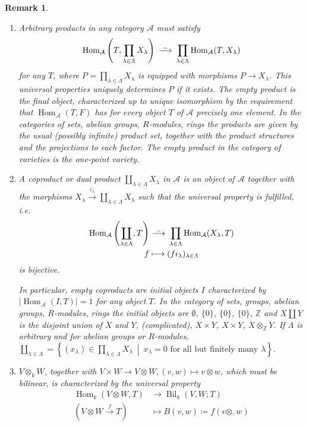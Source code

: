 \documentclass[DIV=14,parskip=full,pointednumbers]{scrartcl}
\newenvironment{alphanumerate}{\begin{enumerate}[label={\upshape(\alph*)},ref=\curthm]}{\end{enumerate}}
\theoremstyle{cthm}
\theoremstyle{cvarthm}
\theoremstyle{cdef}
\newtheorem*{rem*}{Remark}
\newcommand{\Aa}{\mathcal{A}}
\newcommand{\IZ}{\mathbb{Z}}
\newcommand{\Hom}{\operatorname{Hom}}
\newcommand{\longto}{\longrightarrow}
\newcommand{\isomorphism}{
	\tikz[baseline=(a.base)] \node (a) at (0,0) {$\longrightarrow$} node[above=-0.25ex] {\tiny $\sim$};}
\newcommand{\morphism}[1][]{\overset{#1}{\longto}}
\newcommand{\st}{\ \middle|\ }
\begin{document}
	\begin{rem*}
		\begin{alphanumerate}
		\item 
			Arbitrary products in any category $\Aa$ must satisfy \begin{align*}
				\Hom_\Aa\left(T, \prod_{\lambda\in \Lambda} X_\lambda\right) \isomorphism \prod_{\lambda\in\Lambda} \Hom_\Aa(T,X_\lambda)
			\end{align*} for any $T$, where $P=\prod_{\lambda\in\Lambda} X_\lambda$ is equipped with morphisms $P\to X_\lambda$. This universal properties uniquely determines $P$ if it exists. The empty product is the \emph{final object}, characterized up to unique isomorphism by the requirement that $\Hom_\Aa(T,F)$ has for every object $T$ of $\Aa$ precisely one element. In the categories of sets, abelian groups, $R$-modules, rings the products are given by the usual (possibly infinite) product set, together with the product structures and the projections to each factor. The empty product in the category of varieties is the one-point variety.
		\item 
			A \emph{coproduct} or \emph{dual product} $\coprod_{\lambda\in \Lambda} X_\lambda$ in $\Aa$ is an object of $\Aa$ together with the morphisms $X_\lambda \morphism[i_\lambda] \coprod_{\lambda\in\Lambda} X_\lambda$ such that the universal property is fulfilled, i.e. 
			\begin{align*}
				\Hom_\Aa\left(\coprod_{\lambda\in\Lambda} , T\right) &\isomorphism \prod_{\lambda\in\Lambda} \Hom_\Aa(X_\lambda, T)\\
				f &\longmapsto (fi_\lambda)_{\lambda\in\Lambda}
			\end{align*}
			is bijective. 
			
			In particular, empty coproducts are \emph{initial} objects $I$ characterized by $|\Hom_\Aa(I,T)| = 1$ for any object $T$. In the category of sets, groups, abelian groups, $R$-modules, rings the initial objects are $\emptyset$, $\{0\}$, $\{0\}$, $\{0\}$, $\IZ$ and $X\amalg Y$ is the disjoint union of $X$ and $Y$, (complicated), $X\times Y$, $X\times Y$, $X\otimes_\IZ Y$. If $\Lambda$ is arbitrary and for abelian groups or $R$-modules, $\coprod_{\lambda\in \Lambda} = \left\{(x_\lambda) \in \prod_{\lambda\in \Lambda} X_\lambda\st x_\lambda = 0 \text{ for all but finitely many } \lambda \right\}$.
		\item 
			$V\otimes_k W$, together with $V\times W\to V\otimes W, (v,w) \mapsto v\otimes w$, which must be bilinear, is characterized by the universal property
			\begin{align*}
				\Hom_k(V\otimes W, T)&\longto \operatorname{Bil}_k(V,W; T)\\
				(V\otimes W \morphism[f] T) &\longmapsto B(v,w) \coloneqq f(v\otimes, w)
			\end{align*}


		\end{alphanumerate}

	\end{rem*}
\end{document}
